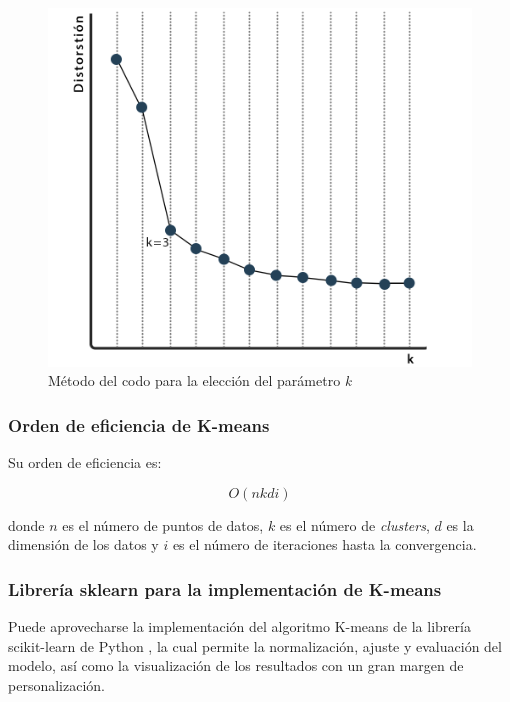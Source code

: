 \begin{figure}[H]
    \centering
    \includegraphics[width=0.75\linewidth]{imagenes/metodo-codo.png}
    \caption{Método del codo para la elección del parámetro \textit{k}}
    \label{fig:metodo-codo}
\end{figure}

\newpage

\subsubsection*{Orden de eficiencia de K-means}

Su orden de eficiencia es:

\vspace{-0.2cm}

\begin{equation}
    O(nkdi)
\end{equation}

donde \( n \) es el número de puntos de datos, \( k \) es el número de \textit{clusters}, \( d \) es la dimensión de los datos y \( i \) es el número de iteraciones hasta la convergencia. \\

\vspace{-3mm}

\subsubsection*{Librería sklearn para la implementación de K-means}

Puede aprovecharse la implementación del algoritmo K-means de la librería scikit-learn de Python \cite{datacamp_kmeans_2023}, la cual permite la normalización, ajuste y evaluación del modelo, así como la visualización de los resultados con un gran margen de personalización. \\

